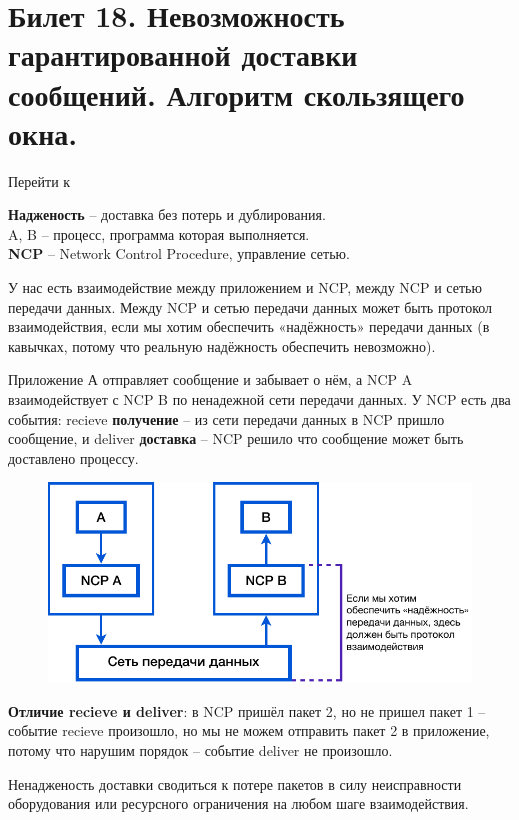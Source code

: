 \newpage
\section{Билет 18. Невозможность гарантированной доставки сообщений. Алгоритм скользящего окна.} \label{b18:part1}

Перейти к~

\textbf{Надженость} -- доставка без потерь и дублирования. \\
A, B -- процесс, программа которая выполняется.\\
\textbf{NCP} -- Network Control Procedure, управление сетью.

У нас есть взаимодействие между приложением и NCP, между NCP и сетью передачи данных.
Между NCP и сетью передачи данных может быть протокол взаимодействия, если мы хотим обеспечить «надёжность» передачи данных (в кавычках, потому что реальную надёжность обеспечить невозможно).

Приложение А отправляет сообщение и забывает о нём, а NCP A взаимодействует с NCP B по ненадежной сети передачи данных.
У NCP есть два события: recieve \textbf{получение} -- из сети передачи данных в NCP пришло сообщение, и deliver \textbf{доставка} -- NCP решило что сообщение может быть доставлено процессу.

\newline
\begin{figure}[H] \centering
	\includegraphics[scale = 1]{18/common.pdf}
\end{figure}

\textbf{Отличие recieve и deliver}: в NCP пришёл пакет 2, но не пришел пакет 1 -- событие recieve произошло, но мы не можем отправить пакет 2 в приложение, потому что нарушим порядок -- событие deliver не произошло.

Ненадженость доставки сводиться к потере пакетов в силу неисправности оборудования или ресурсного ограничения на любом шаге взаимодействия.
\bigskip

